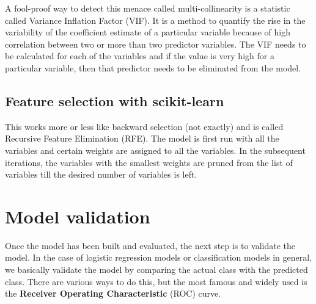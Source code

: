 \documentclass{article}
\numberwithin{equation}{section} %
\begin{document}
A fool-proof way to detect this menace called multi-collinearity is a statistic called Variance Inflation Factor (VIF). It is a method to quantify the rise in the variability of the coefficient estimate of a particular variable because of high correlation between two or more than two predictor variables. The VIF needs to be calculated for each of the variables and if the value is very high for a particular variable, then that predictor needs to be eliminated from the model.

\subsection*{Feature selection with scikit-learn}

This works more or less like backward selection (not exactly) and is called Recursive Feature Elimination (RFE). The model is first run with all the variables and certain weights are assigned to all the variables. In the subsequent iterations, the variables with the smallest weights are pruned from the list of variables till the desired number of variables is left.

\section{Model validation}

Once the model has been built and evaluated, the next step is to validate the model.
In the case of logistic regression models or classification models in general, we
basically validate the model by comparing the actual class with the predicted class.
There are various ways to do this, but the most famous and widely used is the
\textbf{Receiver Operating Characteristic} (ROC) curve.
\end{document}
